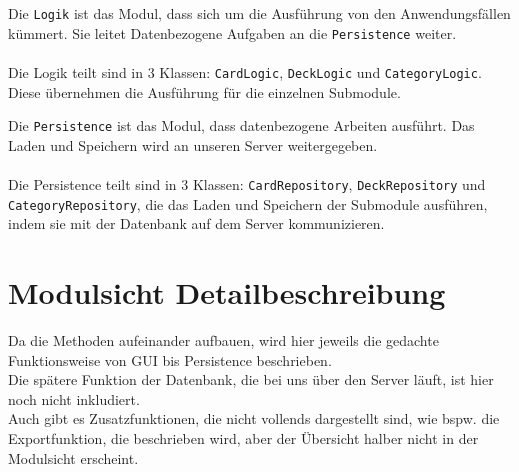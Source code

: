 \documentclass[fontsize=12pt,paper=A4,twoside]{scrartcl}
\begin{document}
    Die \texttt{Logik} ist das Modul, dass sich um die Ausführung von den Anwendungsfällen kümmert.
    Sie leitet Datenbezogene Aufgaben an die \texttt{Persistence} weiter.\\\\
    Die Logik teilt sind in 3 Klassen: \texttt{CardLogic}, \texttt{DeckLogic} und \texttt{CategoryLogic}. Diese übernehmen
    die Ausführung für die einzelnen Submodule.

    Die \texttt{Persistence} ist das Modul, dass datenbezogene Arbeiten ausführt. Das Laden und Speichern wird
    an unseren Server weitergegeben.\\\\
    Die Persistence teilt sind in 3 Klassen: \texttt{CardRepository}, \texttt{DeckRepository} und \texttt{CategoryRepository}, die das Laden und Speichern der
    Submodule ausführen, indem sie mit der Datenbank auf dem Server kommunizieren.



    \section{Modulsicht Detailbeschreibung}
    Da die Methoden aufeinander aufbauen, wird hier jeweils die gedachte Funktionsweise von GUI bis Persistence beschrieben.\\
    Die spätere Funktion der Datenbank, die bei uns über den Server läuft, ist hier noch nicht inkludiert.\\
    Auch gibt es Zusatzfunktionen, die nicht vollends dargestellt sind, wie bspw. die Exportfunktion, die beschrieben wird,
    aber der Übersicht halber nicht in der Modulsicht erscheint.\\\\
\end{document}
